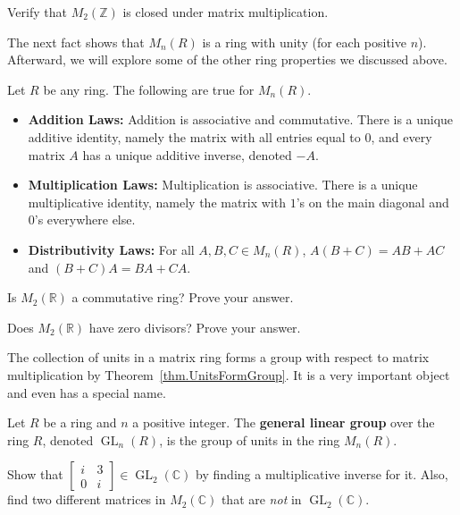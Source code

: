 \begin{problem}
Verify that $M_{2}(\mathbb{Z})$ is closed under matrix multiplication.
\end{problem}

The next fact shows that $M_{n}(R)$ is a ring with unity (for each positive $n$). Afterward, we will explore some of the other ring properties we discussed above.

\begin{fact} Let $R$ be any ring. The following are true for $M_{n}(R)$.
\begin{itemize}
\item \textbf{Addition Laws:} Addition is associative and commutative. There is a unique additive identity, namely the matrix with all entries equal to $0$, and every matrix $A$ has a unique additive inverse, denoted $-A$.
\item \textbf{Multiplication Laws:} Multiplication is associative. There is a unique multiplicative identity, namely the matrix with $1$'s on the main diagonal and $0$'s everywhere else.
\item \textbf{Distributivity Laws:} For all $A,B,C \in M_{n}(R)$, $A(B+C) = AB+AC$ and $(B+C)A = BA + CA$.
\end{itemize}
\end{fact}

\begin{problem}
Is $M_{2}(\mathbb{R})$ a commutative ring? Prove your answer.
\end{problem}

\begin{problem}
Does $M_{2}(\mathbb{R})$ have zero divisors? Prove your answer. 
\end{problem}

The collection of units in a matrix ring forms a group with respect to matrix multiplication by Theorem~\ref{thm.UnitsFormGroup}. It is a very important object and even has a special name.

\begin{definition}
Let $R$ be a ring and $n$ a positive integer. The \textbf{general linear group} over the ring $R$,  denoted $\operatorname{GL}_n(R)$, is the group of units in the ring $M_{n}(R)$.
\end{definition}

\begin{problem}
Show that $\begin{bmatrix} i & 3\\ 0& i\end{bmatrix}\in\operatorname{GL}_{2}(\mathbb{C})$ by finding a multiplicative inverse for it. Also, find two different matrices in $M_{2}(\mathbb{C})$ that are \emph{not} in  $\operatorname{GL}_{2}(\mathbb{C})$.
\end{problem}


